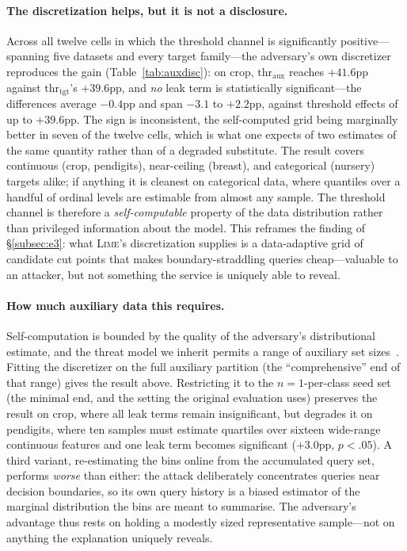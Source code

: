\documentclass[sigconf,anonymous,review]{acmart}
\begin{document}
\paragraph{The discretization helps, but it is not a disclosure.} Across all twelve cells in which the
threshold channel is significantly positive---spanning five datasets and every target family---the
adversary's own discretizer reproduces the gain (Table~\ref{tab:auxdisc}): on crop,
$\text{thr}_{\text{aux}}$ reaches $+41.6$pp against $\text{thr}_{\text{tgt}}$'s $+39.6$pp, and
\emph{no} leak term is statistically significant---the differences average $-0.4$pp and span $-3.1$
to $+2.2$pp, against threshold effects of up to $+39.6$pp. The sign is inconsistent, the self-computed
grid being marginally better in seven of the twelve cells, which is what one expects of two estimates
of the same quantity rather than of a degraded substitute.
The result covers continuous (crop, pendigits), near-ceiling (breast), and categorical (nursery)
targets alike; if anything it is cleanest on categorical data, where quantiles over a handful of
ordinal levels are estimable from almost any sample. The threshold channel is therefore a
\emph{self-computable} property of the data distribution rather than privileged information about the
model. This reframes the finding of \S\ref{subsec:e3}: what \textsc{Lime}'s discretization supplies is
a data-adaptive grid of candidate cut points that makes boundary-straddling queries cheap---valuable
to an attacker, but not something the service is uniquely able to reveal.

\paragraph{How much auxiliary data this requires.} Self-computation is bounded by the quality of the
adversary's distributional estimate, and the threat model we inherit permits a range of auxiliary set
sizes~\cite{oksuz2024autolycus}. Fitting the discretizer on the full auxiliary partition (the
``comprehensive'' end of that range) gives the result above. Restricting it to the $n{=}1$-per-class
seed set (the minimal end, and the setting the original evaluation uses) preserves the result on crop,
where all leak terms remain insignificant, but degrades it on pendigits, where ten samples must
estimate quartiles over sixteen wide-range continuous features and one leak term becomes significant
($+3.0$pp, $p{<}.05$). A third variant, re-estimating the bins online from the accumulated query set,
performs \emph{worse} than either: the attack deliberately concentrates queries near decision
boundaries, so its own query history is a biased estimator of the marginal distribution the bins are
meant to summarise. The adversary's advantage thus rests on holding a modestly sized representative
sample---not on anything the explanation uniquely reveals.
\end{document}
